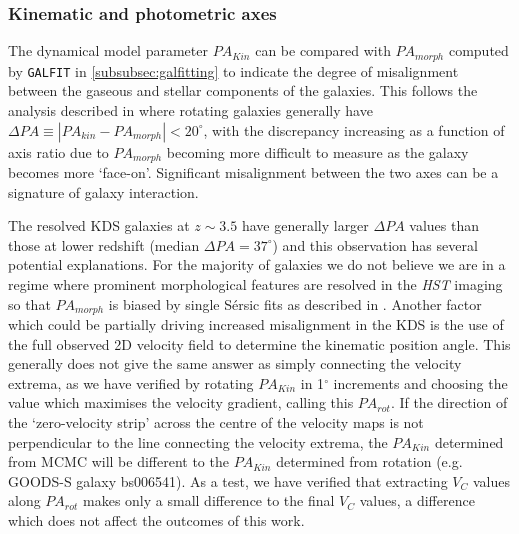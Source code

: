 \documentclass[fleqn,usenatbib]{mn2e}
\newcommand{\Sers}{S\'{e}rsic }
\begin{document}
\subsubsection{Kinematic and photometric axes}\label{subsubsection:kin_and_phot}

The dynamical model parameter $PA_{Kin}$ can be compared with $PA_{morph}$ computed by {\tt GALFIT} in \cref{subsubsec:galfitting} to indicate the degree of misalignment between the gaseous and stellar components of the galaxies.
This follows the analysis described in \citep[e.g.][]{Epinat2008,Epinat2012,Barrera-Ballesteros2014,Barrera-Ballesteros2015,Wisnioski2015,Harrison2017} where rotating galaxies generally have $\Delta PA \equiv |PA_{kin}-PA_{morph}| < 20^{\circ}$, with the discrepancy increasing as a function of axis ratio due to $PA_{morph}$ becoming more difficult to measure as the galaxy becomes more `face-on'.
Significant misalignment between the two axes can be a signature of galaxy interaction.

The resolved KDS galaxies at $z \sim 3.5$ have generally larger $\Delta PA$ values than those at lower redshift (median $\Delta PA = 37^{\circ}$) and this observation has several potential explanations.
For the majority of galaxies we do not believe we are in a regime where prominent morphological features are resolved in the {\em HST} imaging so that $PA_{morph}$ is biased by single \Sers fits as described in \cite{Rodrigues2016}.
Another factor which could be partially driving increased misalignment in the KDS is the use of the full observed 2D velocity field to determine the kinematic position angle.
This generally does not give the same answer as simply connecting the velocity extrema, as we have verified by rotating $PA_{Kin}$ in 1$^{\circ}$ increments and choosing the value which maximises the velocity gradient, calling this $PA_{rot}$.
If the direction of the `zero-velocity strip' across the centre of the velocity maps is not perpendicular to the line connecting the velocity extrema, the $PA_{Kin}$ determined from MCMC will be different to the $PA_{Kin}$ determined from rotation (e.g. GOODS-S galaxy bs006541).
As a test, we have verified that extracting $V_{C}$ values along $PA_{rot}$ makes only a small difference to the final $V_{C}$ values, a difference which does not affect the outcomes of this work.
\end{document}
